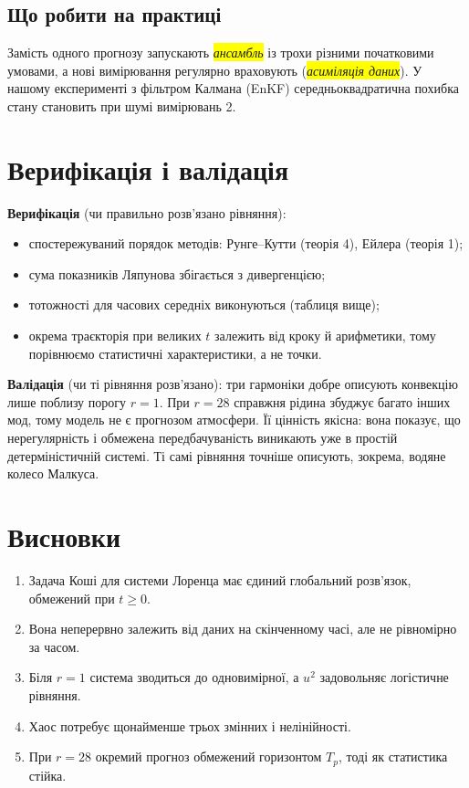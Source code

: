 \documentclass[11pt,a4paper]{article}
\newcommand{\term}[1]{\colorbox{Mark}{\textit{#1}}}
\begin{document}
\subsection{Що робити на практиці}
Замість одного прогнозу запускають \term{ансамбль} із трохи різними початковими умовами, а нові
вимірювання регулярно враховують (\term{асиміляція даних}). У нашому експерименті з фільтром
Калмана (EnKF) середньоквадратична похибка стану становить \enkfRmse{} при шумі вимірювань 2.

\section{Верифікація і валідація}
\textbf{Верифікація} (чи правильно розв'язано рівняння):
\begin{itemize}
\item спостережуваний порядок методів: Рунге–Кутти \orderRK{} (теорія 4), Ейлера \orderEuler{} (теорія 1);
\item сума показників Ляпунова збігається з дивергенцією;
\item тотожності для часових середніх виконуються (таблиця вище);
\item окрема траєкторія при великих $t$ залежить від кроку й арифметики, тому порівнюємо
статистичні характеристики, а не точки.
\end{itemize}
\textbf{Валідація} (чи ті рівняння розв'язано): три гармоніки добре описують конвекцію лише
поблизу порогу $r=1$. При $r=28$ справжня рідина збуджує багато інших мод, тому модель не є
прогнозом атмосфери. Її цінність якісна: вона показує, що нерегулярність і обмежена
передбачуваність виникають уже в простій детерміністичній системі. Ті самі рівняння точніше
описують, зокрема, водяне колесо Малкуса.

\section{Висновки}
\begin{enumerate}
\item Задача Коші для системи Лоренца має єдиний глобальний розв'язок, обмежений при $t\ge0$.
\item Вона неперервно залежить від даних на скінченному часі, але не рівномірно за часом.
\item Біля $r=1$ система зводиться до одновимірної, а $u^2$ задовольняє логістичне рівняння.
\item Хаос потребує щонайменше трьох змінних і нелінійності.
\item При $r=28$ окремий прогноз обмежений горизонтом $T_p$, тоді як статистика стійка.
\end{enumerate}
\end{document}
